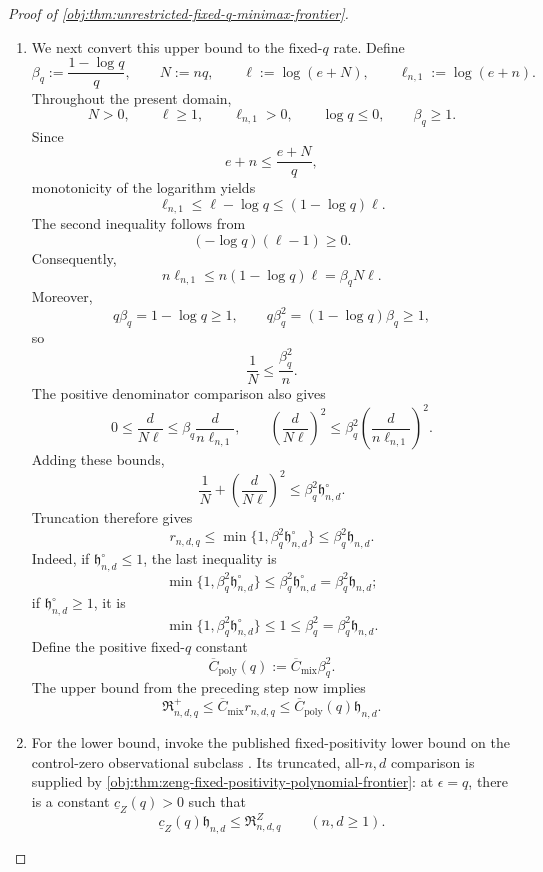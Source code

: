 \documentclass[11pt]{article}
\begin{document}
\begin{proof}[Proof of \cref{obj:thm:unrestricted-fixed-q-minimax-frontier}]
\begin{enumerate}
\item
We next convert this upper bound to the fixed-\(q\) rate. Define
\[
\beta_q:=\frac{1-\log q}{q},
\qquad
N:=nq,
\qquad
\ell:=\log(e+N),
\qquad
\ell_{n,1}:=\log(e+n).
\]
Throughout the present domain,
\[
N>0,\qquad \ell\ge1,\qquad \ell_{n,1}>0,
\qquad \log q\le0,\qquad \beta_q\ge1.
\]
Since
\[
e+n\le\frac{e+N}{q},
\]
monotonicity of the logarithm yields
\[
\ell_{n,1}\le\ell-\log q
\le(1-\log q)\ell.
\]
The second inequality follows from
\[
(-\log q)(\ell-1)\ge0.
\]
Consequently,
\[
n\ell_{n,1}
\le n(1-\log q)\ell
=\beta_q N\ell.
\]
Moreover,
\[
q\beta_q=1-\log q\ge1,
\qquad
q\beta_q^2=(1-\log q)\beta_q\ge1,
\]
so
\[
\frac1N\le\frac{\beta_q^2}{n}.
\]
The positive denominator comparison also gives
\[
0\le\frac{d}{N\ell}
\le\beta_q\frac{d}{n\ell_{n,1}},
\qquad
\left(\frac{d}{N\ell}\right)^2
\le\beta_q^2
\left(\frac{d}{n\ell_{n,1}}\right)^2.
\]
Adding these bounds,
\[
\frac1N+\left(\frac{d}{N\ell}\right)^2
\le\beta_q^2\mathfrak h_{n,d}^{\circ}.
\]
Truncation therefore gives
\[
r_{n,d,q}
\le\min\{1,\beta_q^2\mathfrak h_{n,d}^{\circ}\}
\le\beta_q^2\mathfrak h_{n,d}.
\]
Indeed, if \(\mathfrak h_{n,d}^{\circ}\le1\), the last inequality is
\[
\min\{1,\beta_q^2\mathfrak h_{n,d}^{\circ}\}
\le\beta_q^2\mathfrak h_{n,d}^{\circ}
=\beta_q^2\mathfrak h_{n,d};
\]
if \(\mathfrak h_{n,d}^{\circ}\ge1\), it is
\[
\min\{1,\beta_q^2\mathfrak h_{n,d}^{\circ}\}
\le1\le\beta_q^2
=\beta_q^2\mathfrak h_{n,d}.
\]
Define the positive fixed-\(q\) constant
\[
\overline C_{\mathrm{poly}}(q)
:=\overline C_{\mathrm{mix}}\beta_q^2.
\]
The upper bound from the preceding step now implies
\[
\mathfrak R^+_{n,d,q}
\le\overline C_{\mathrm{mix}}r_{n,d,q}
\le\overline C_{\mathrm{poly}}(q)\mathfrak h_{n,d}.
\]

\item
For the lower bound, invoke the published fixed-positivity lower bound on the control-zero observational subclass
\citep[Theorem~2, Section~3.2, p.~9, with its proof in Section~C.5, pp.~39--44]{ZengBalakrishnanHanKennedy2026}.
Its truncated, all-\(n,d\) comparison is supplied by
\cref{obj:thm:zeng-fixed-positivity-polynomial-frontier}: at \(\epsilon=q\), there is a constant \(\underline c_Z(q)>0\) such that
\[
\underline c_Z(q)\mathfrak h_{n,d}
\le\mathfrak R^Z_{n,d,q}
\qquad(n,d\ge1).
\]


\end{enumerate}
\end{proof}
\end{document}
